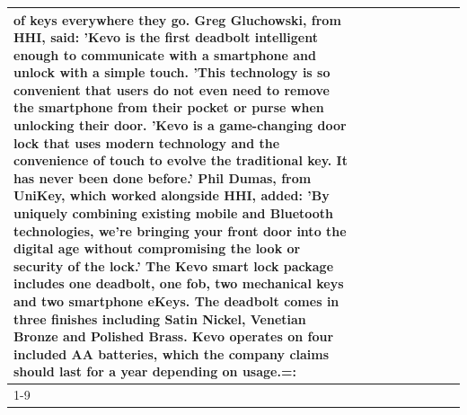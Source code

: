 \begin{table}[H]
\begin{tabular}{lllrlllll}
of keys everywhere they go. Greg Gluchowski, from HHI, said: 'Kevo is the first deadbolt intelligent enough to communicate with a smartphone and unlock with a simple touch. 'This technology is so convenient that users do not even need to remove the smartphone from their pocket or purse when unlocking their door. 'Kevo is a game-changing door lock that uses modern technology and the convenience of touch to evolve the traditional key. It has never been done before.' Phil Dumas, from UniKey, which worked alongside HHI, added: 'By uniquely combining existing mobile and Bluetooth technologies, we’re bringing your front door into the digital age without compromising the look or security of the lock.' The Kevo smart lock package includes one deadbolt, one fob, two mechanical keys and two smartphone eKeys. The deadbolt comes in three finishes including Satin Nickel, Venetian Bronze and Polished Brass. Kevo operates on four included AA batteries, which the company claims should last for a year depending on usage.=: \\
\cline{1-9}

\end{tabular}
\end{table}
